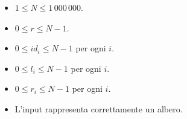\Constraints

\begin{itemize}[nolistsep, itemsep=2mm]
    \item $1 \leq N \leq 1\,000\,000$.
    \item $0 \leq r \leq N-1$.
    \item $0 \leq id_i \leq N-1$ per ogni $i$.
    \item $0 \leq l_i \leq N-1$ per ogni $i$.
    \item $0 \leq r_i \leq N-1$ per ogni $i$.
    \item L'input rappresenta correttamente un albero.
\end{itemize}



\Examples

\begin{example}
%
\end{example}



